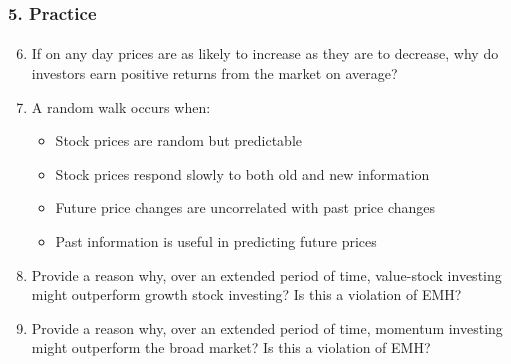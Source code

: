 \documentclass{beamer}
\begin{document}
\begin{practiceframe}[t]
    \frametitle{5. Practice}
    \framesubtitle{}

        \begin{enumerate}
            \setcounter{enumi}{5} 
            \item If on any day prices are as likely to increase as they are to decrease, 
            why do investors earn positive returns from the market on average?
            \item A random walk occurs when:
            \begin{itemize}
                \item Stock prices are random but predictable
                \item Stock prices respond slowly to both old and new information
                \item Future price changes are uncorrelated with past price changes
                \item Past information is useful in predicting future prices
            \end{itemize}
            \item Provide a reason why, over an extended period of time, value-stock investing 
            might outperform growth stock investing?   Is this a violation of EMH?
            \item Provide a reason why, over an extended period of time, momentum investing 
            might outperform the broad market?   Is this a violation of EMH?
        \end{enumerate}

\end{practiceframe}
\end{document}
